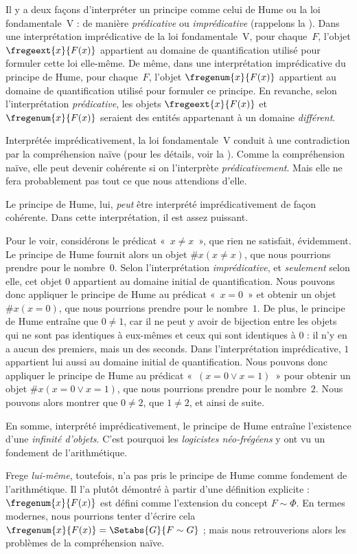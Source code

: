 \documentclass[../../../include/open-logic-section]{subfiles}
\begin{document}
Il y a deux façons d'interpréter un principe
comme celui de Hume ou la loi fondamentale~V :
de manière \emph{prédicative} ou
\emph{imprédicative} (rappelons
la ). Dans une
interprétation imprédicative de la loi
fondamentale~V, pour chaque~$F$, l'objet
$\fregeext{x}{F(x)}$ appartient au domaine de
quantification utilisé pour formuler cette loi
elle-même. De même, dans une interprétation
imprédicative du principe de Hume, pour
chaque~$F$, l'objet $\fregenum{x}{F(x)}$
appartient au domaine de quantification
utilisé pour formuler ce principe.
En revanche, selon l'interprétation
\emph{prédicative}, les objets
$\fregeext{x}{F(x)}$ et
$\fregenum{x}{F(x)}$ seraient des entités
appartenant à un domaine \emph{différent}.

Interprétée imprédicativement, la loi
fondamentale~V conduit à une contradiction
par la compréhension naïve (pour les détails,
voir la ). Comme la
compréhension naïve, elle peut devenir
cohérente si on l'interprète
\emph{prédicativement}. Mais elle ne fera
probablement pas tout ce que nous attendions
d'elle.

Le principe de Hume, lui, \emph{peut}
être interprété imprédicativement de façon
cohérente. Dans cette interprétation, il est
assez puissant.

Pour le voir, considérons le prédicat
«~$x \neq x$~», que rien ne satisfait,
évidemment. Le principe de Hume fournit
alors un objet $\# x( x\neq x)$, que nous
pourrions prendre pour le nombre~$0$.
Selon l'interprétation \emph{imprédicative},
et \emph{seulement} selon elle, cet objet $0$
appartient au domaine initial de quantification.
Nous pouvons donc appliquer le principe de Hume
au prédicat «~$x = 0$~» et obtenir un objet
$\#x (x = 0)$, que nous pourrions prendre pour
le nombre~$1$. De plus, le principe de Hume
entraîne que $0 \neq 1$, car il ne peut y
avoir de bijection entre les objets qui ne
sont pas identiques à eux-mêmes et ceux qui
sont identiques à $0$ : il n'y en a aucun
des premiers, mais un des seconds. Dans
l'interprétation imprédicative, $1$ appartient
lui aussi au domaine initial de quantification.
Nous pouvons donc appliquer le principe de
Hume au prédicat «~$(x = 0 \lor x = 1)$~»
pour obtenir un objet
$\#x(x = 0 \lor x = 1)$, que nous pourrions
prendre pour le nombre~$2$. Nous pouvons
alors montrer que $0\neq 2$, que
$1 \neq 2$, et ainsi de suite.

En somme, interprété imprédicativement,
le principe de Hume entraîne l'existence
d'une \emph{infinité d'objets}. C'est
pourquoi les \emph{logicistes néo-frégéens}
y ont vu un fondement de l'arithmétique.

Frege \emph{lui-même}, toutefois, n'a pas
pris le principe de Hume comme fondement
de l'arithmétique. Il l'a plutôt démontré
à partir d'une définition explicite :
$\fregenum{x}{F(x)}$ est défini comme
l'extension du concept $F \sim \Phi$.
En termes modernes, nous pourrions tenter
d'écrire cela
$\fregenum{x}{F(x)} = \Setabs{G}{F \sim G}$ ;
mais nous retrouverions alors les problèmes
de la compréhension naïve.
\end{document}
